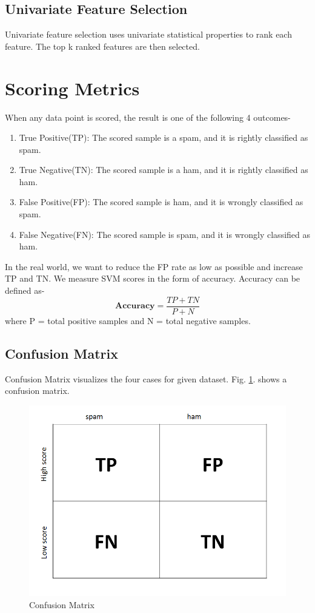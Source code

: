 \subsection{Univariate Feature Selection}
\par Univariate feature selection uses univariate statistical properties to rank each feature. The top k ranked features are then selected.

\section{Scoring Metrics}
\par When any data point is scored, the result is one of the following 4 outcomes- 
\begin{enumerate}
	
	\item True Positive(TP): The scored sample is a spam, and it is rightly classified as spam.
	\item True Negative(TN): The scored sample is a ham, and it is rightly classified as ham.
	\item False Positive(FP): The scored sample is ham, and it is wrongly classified as spam.
	\item False Negative(FN): The scored sample is spam, and it is wrongly classified as ham.
\end{enumerate} 
\par In the real world, we want to reduce the FP rate as low as possible and increase TP and TN. We measure SVM scores in the form of accuracy. Accuracy can be defined as- 
\[ \textbf{Accuracy} =  \frac{TP+TN}{P+N} \]
where P = total positive samples and N = total negative samples.

\subsection{Confusion Matrix}
\par Confusion Matrix visualizes the four cases for given dataset. Fig. \ref{fig:confusionMatrix}. shows a confusion matrix.

\begin{figure}
	\centering
	\includegraphics[width=0.5\linewidth]{images/confusionMatrix}
	\caption{Confusion Matrix}
	\label{fig:confusionMatrix}
\end{figure}


